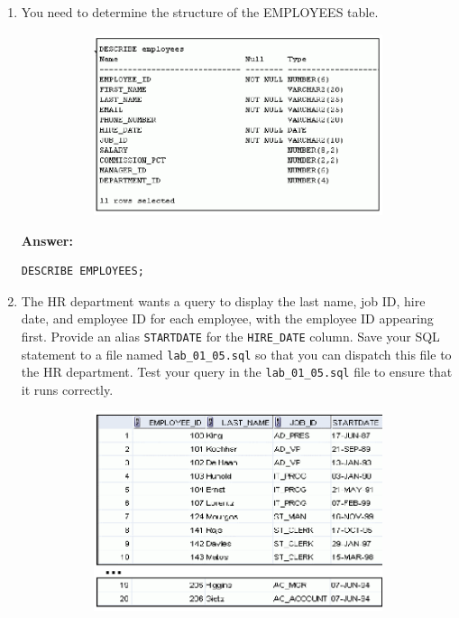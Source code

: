 \documentclass[a4paper,12pt]{article}
\begin{document}
\begin{enumerate}[start=4]
    \newpage
    \item You need to determine the structure of the EMPLOYEES table.
    \begin{figure}[h]
        \centering
        \begin{subfigure}[b]{0.3\linewidth}
            \centering
            \includegraphics[width=1.5\linewidth]{graphics/5.png}
        \end{subfigure}
    \end{figure}
    
    \textbf{Answer: }
    \begin{lstlisting}[language=SQL]
DESCRIBE EMPLOYEES;
    \end{lstlisting}
    
    \item The HR department wants a query to display the last name, job ID, hire date, and employee ID for each employee, with the employee ID appearing first. Provide an alias \texttt{STARTDATE} for the \texttt{HIRE\_DATE} column. Save your SQL statement to a file named \texttt{lab\_01\_05.sql} so that you can dispatch this file to the HR department.
    Test your query in the \texttt{lab\_01\_05.sql} file to ensure that it runs correctly.
    \begin{figure}[h]
        \centering
        \begin{subfigure}[b]{0.45\linewidth}
            \centering
            \includegraphics[width=\linewidth]{graphics/6.png}
        \end{subfigure}
    \end{figure}
    

\end{enumerate}
\end{document}
